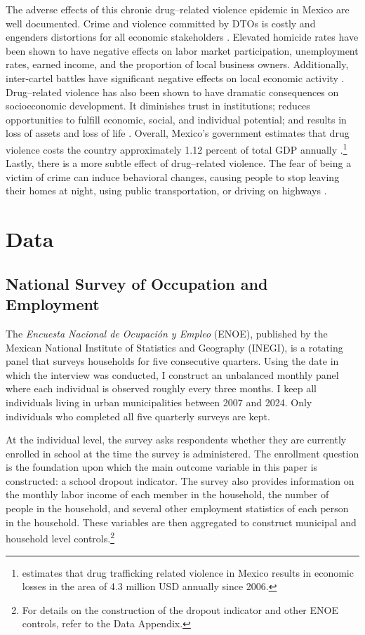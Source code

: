 \documentclass[12pt,letter,english,intoc,bibliography=totoc,index=totoc,BCOR10mm,captions=tableheading,nottitlepage,fleqn]{article}
\theoremstyle{break}
\begin{document}
The adverse effects of this chronic drug--related violence epidemic in Mexico are well documented. Crime and violence committed by DTOs is costly and engenders distortions for all economic stakeholders \citep{jaitman2017}. Elevated homicide rates have been shown to have negative effects on labor market participation, unemployment rates, earned income, and the proportion of local business owners. Additionally, inter-cartel battles have significant negative effects on local economic activity \citep{Calderon2013}. Drug--related violence has also been shown to have dramatic consequences on socioeconomic development. It diminishes trust in institutions; reduces opportunities to fulfill economic, social, and individual potential; and results in loss of assets and loss of life \citep{imf2024violent}. Overall, Mexico's government estimates that drug violence costs the country approximately 1.12 percent of total GDP annually \citep{jones2013kingpin}.\footnote{\citet{rios2013} estimates that drug trafficking related violence in Mexico results in economic losses in the area of 4.3 million USD annually since 2006.} Lastly, there is a more subtle effect of drug--related violence. The fear of being a victim of crime can induce behavioral changes, causing people to stop leaving their homes at night, using public transportation, or driving on highways \citep{diazcayeros2017}.
\section{Data}
\subsection{National Survey of Occupation and Employment}
The \textit{Encuesta Nacional de Ocupaci\'{o}n y Empleo} (ENOE), published by the Mexican National Institute of Statistics and Geography (INEGI), is a rotating panel that surveys households for five consecutive quarters. Using the date in which the interview was conducted, I construct an unbalanced monthly panel where each individual is observed roughly every three months. I keep all individuals living in urban municipalities between 2007 and 2024. Only individuals who completed all five quarterly surveys are kept.

At the individual level, the survey asks respondents whether they are currently enrolled in school at the time the survey is administered. The enrollment question is the foundation upon which the main outcome variable in this paper is constructed: a school dropout indicator. The survey also provides information on the monthly labor income of each member in the household, the number of people in the household, and several other employment statistics of each person in the household. These variables are then aggregated to construct municipal and household level controls.\footnote{For details on the construction of the dropout indicator and other ENOE controls, refer to the Data Appendix.} 
\end{document}
